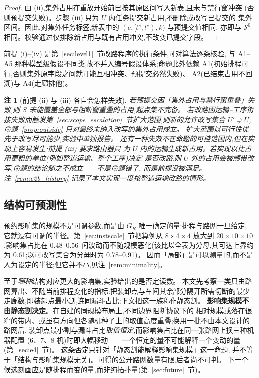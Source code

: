 \documentclass[manuscript,screen,review]{acmart}
\newcommand{\ScaleJobsHi}{20}
\newcommand{\ScaleMachHi}{10}
\newcommand{\ScaleCloLo}{0.48}       %
\newcommand{\ScaleCloHi}{0.56}       %
\newcommand{\ScaleAliveShare}{0.61}  %
\newcommand{\ScaleCloAliveLo}{0.78}  %
\newcommand{\ScaleCloAliveHi}{0.91}  %
\newtheorem{remark}{注}
\begin{document}
\begin{proof}
由 (ii),集外占用在重放开始前已按其原区间写入新表,且未与禁行窗冲突
(否则预提交失败)。步骤 (iii) 只为 \(U\) 内任务提交新占用,不删除或改写已提交的
集外区间。因此,对集外任务标签,新表中的 \((e,[t^s,t^e),k)\) 与预提交值相同,
亦即与 \(\mathcal{S}^0\) 相同。校验通过仅排除新占用与既有占用冲突,不改变已提交字段。
\end{proof}

前提 (i)--(iv) 是第~\ref{sec:level1}~节改路程序的执行条件,可对算法逐条核验,
与 A1--A5 那种模型级假设不同类,故不并入编号假设体系;命题此外依赖
A1(初始排程可行,否则集外原字段之间就可能互相冲突、预提交必然失败)、
A2(已结束占用不回溯)与 A4(走廊排他)。

\begin{remark}[前提 (ii) 与 (iii) 各自会怎样失效]
\label{rem:precommit}
若预提交因「集外占用与禁行窗重叠」失败,则 \(S\) 未能覆盖全部与阻断窗重叠的占用,起点集不完备。
若改路因运输--工序衔接失败而触发第~\ref{sec:scope_escalation}~节扩大范围,则新的允许改写集合
\(U'\supsetneq U\),命题~\ref{prop:outside} 只对最终未纳入改写的集外占用成立。
扩大范围以可行性优先于改写尽可能少,实验中单独报告。
还有一种失效不在命题的可控范围内,但在实现上容易发生:前提 (iii) 要求路由器\emph{只}
为 \(U\) 内的运输生成新占用。若实现以比占用更粗的单位(例如整道运输、整个工序)决定
是否改路,则 \(U\) 外的占用会被顺带改写,命题的结论随之不成立——不是命题错了,
而是前提没被满足。注~\ref{rem:e2b_history} 记录了本文实现一度按整道运输改路的情形。
\end{remark}

\subsection{结构可预测性}
\label{sec:structure}

预约影响集的规模不是可调参数,而是由 \(G_R\) 唯一确定的量:排程与路网一旦给定,
它就没有可调的半径。第~\ref{sec:instscale}~节把算例从 \(8\times4\times4\) 放大到
\(\ScaleJobsHi\times\ScaleMachHi\times\ScaleMachHi\),影响集占比在
\ScaleCloLo--\ScaleCloHi\ 间波动而不随规模恶化(该比以全表为分母,其可达上界约为
\ScaleAliveShare;以可改写集合为分母时为 \ScaleCloAliveLo--\ScaleCloAliveHi)。
因而「局部」是可以测量的,而不是人为设定的半径;但它并不小,见注~\ref{rem:minimality}。

至于\emph{哪种}结构对应更大的影响集,实验给出的是否定读数。
本文先考察一类只由路网算出、不随当前排程变化的指标:把装卸点与车间其余部分隔开所需切断的最少走廊数,即装卸点最小割,连同漏斗占比;下文把这一族称作静态割。
\textbf{影响集规模不由静态割决定}。在自建的同规模布局上,不同边界阻断协议下的
相对规模或落在很窄的带内、或虽有方向但各随机种子上的取值高度重叠;换用一批不由本文设计的路网后,
装卸点最小割与漏斗占比\emph{取值恒定},而影响集占比在同一张路网上换三种机器配置
(\(6\)、\(7\)、\(8\) 机)时即大幅移动——一个恒定的量不可能解释一个变动的量
(第~\ref{sec:e4}~节)。
这条否定只针对「静态割能解释影响集规模」这一命题,
并不等于「结构与影响集规模无关」。可得的公开路网数量有限,后者尚不可判。
下一个候选刻画应是随排程而变的量,而非纯拓扑量(第~\ref{sec:future}~节)。
\end{document}
